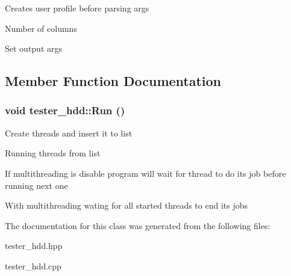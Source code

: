 Creates user profile before parsing args

Number of columns

Set output args 



\subsection{Member Function Documentation}
\hypertarget{classtester__hdd_abfdcc395e8be504dfd0ea686da790375}{
\subsubsection[{Run}]{\setlength{\rightskip}{0pt plus 5cm}void tester\_\-hdd::Run ()}}
\label{classtester__hdd_abfdcc395e8be504dfd0ea686da790375}


Create threads and insert it to list

Running threads from list

If multithreading is disable program will wait for thread to do its job before running next one

With multithreading wating for all started threads to end its jobs 



The documentation for this class was generated from the following files:\begin{DoxyCompactItemize}
\item 
tester\_\-hdd.hpp\item 
tester\_\-hdd.cpp\end{DoxyCompactItemize}
